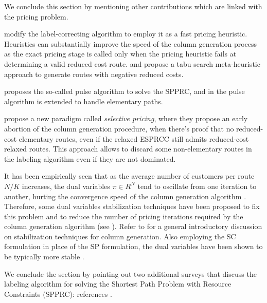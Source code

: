 \medskip

We conclude this section by mentioning other contributions
which are linked with the pricing problem.

\textcite{fukasawa2006} modify the label-correcting
algorithm to employ it as a fast pricing heuristic.
Heuristics can substantially improve the speed of the column generation process
as the exact pricing stage is called only when the pricing heuristic
fails at determining a valid reduced cost route.
\textcite{desaulniers2008} and \textcite{archetti2011} propose a tabu search
meta-heuristic approach to generate routes with negative reduced costs.

\textcite{lozano2013} proposes the so-called pulse algorithm
to solve the SPPRC, and in \textcite{lozano2016} the pulse algorithm
is extended to handle elementary paths.

\textcite{desaulniers2019} propose a new paradigm called \textit{selective pricing},
where they propose an early abortion of the column generation procedure,
when there's proof that no reduced-cost elementary routes,
even if the relaxed ESPRCC still admits reduced-cost relaxed routes.
This approach allows to discard some non-elementary routes
in the labeling algorithm even if they are not dominated.

It has been empirically seen that
as the average number of customers per route $N / K$ increases,
the dual variables $\pi \in R^N$ tend to oscillate from one iteration to another,
hurting the convergence speed of the column generation algorithm \parencite{toth2014}.
Therefore, some dual variables stabilization techniques
have been proposed to fix this problem and
to reduce the number of pricing iterations required
by the column generation algorithm (see \cite{dumerle1999, rousseau2007, pessoa2013, pessoa2018automation}).
Refer to \textcite{vanderbeck2005} for a general introductory
discussion on stabilization techniques for column generation.
Also employing the SC formulation in place of the SP formulation,
the dual variables have been shown to be typically more stable \parencite{rousseau2007, feillet2010}.

We conclude the section by pointing out two additional surveys
that discuss the labeling algorithm for solving the Shortest Path
Problem with Resource Constraints (SPPRC): references \textcite{irnich2005, pugliese2010, pugliese2013}.
